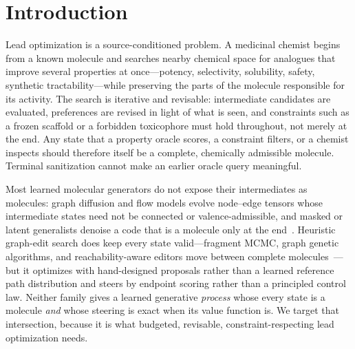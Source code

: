 \section{Introduction}
\label{sec:intro}

Lead optimization is a source-conditioned problem. A medicinal chemist begins from a known molecule
and searches nearby chemical space for analogues that improve several properties at once---potency,
selectivity, solubility, safety, synthetic tractability---while preserving the parts of the molecule
responsible for its activity. The search is iterative and revisable: intermediate candidates are
evaluated, preferences are revised in light of what is seen, and constraints such as a frozen scaffold
or a forbidden toxicophore must hold throughout, not merely at the end. Any state that a property
oracle scores, a constraint filters, or a chemist inspects should therefore itself be a complete,
chemically admissible molecule. Terminal sanitization cannot make an earlier oracle query meaningful.

Most learned molecular generators do not expose their intermediates as molecules: graph diffusion and
flow models evolve node--edge tensors whose intermediate states need not be connected or
valence-admissible, and masked or latent generalists denoise a code that is a molecule only at the
end~\citep{jin2018jtvae,lee2025genmol,gat2024discrete}. Heuristic graph-edit search does keep every state
valid---fragment MCMC, graph genetic algorithms, and reachability-aware editors move between complete
molecules~\citep{xie2021mars,jensen2019graphga,qiao2026molworld}---but it optimizes with hand-designed
proposals rather than a learned reference path distribution and steers by endpoint scoring rather than a
principled control law. Neither family gives a learned generative \emph{process} whose every state is a
molecule \emph{and} whose steering is exact when its value function is. We target that intersection,
because it is what budgeted, revisable, constraint-respecting lead optimization needs.

